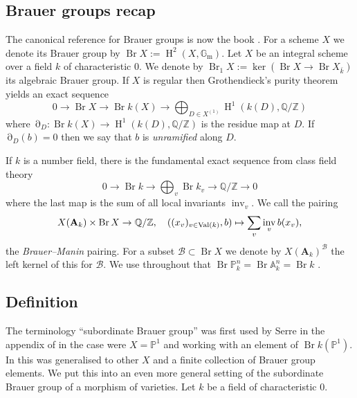 \documentclass[a4paper,12pt,reqno]{amsart}
\numberwithin{equation}{section} \numberwithin{figure}{section}
\DeclareMathOperator{\Br}{Br} \DeclareMathOperator{\Brnr}{Br_{nr}}
\DeclareMathOperator{\inv}{inv} \DeclareMathOperator{\res}{\partial}
\DeclareMathOperator{\HH}{H}
\renewcommand\P{\mathbb{P}}
\newcommand\Z{\mathbb{Z}}
\newcommand\Q{\mathbb{Q}}
\newcommand\G{\mathbb{G}}
\newcommand\Gm{\G_\mathrm{m}}
\newcommand{\Adele}{\mathbf{A}}
\newcommand{\br}{\mathscr{B}}
\newcommand{\A}{\mathbb{A}}
\renewcommand{\#}{\sharp}
\theoremstyle{definition}
\numberwithin{lemma}{section}
\begin{document}
\subsection{Brauer groups recap}

The canonical reference for Brauer groups is now the book \cite{Brauer}. For a scheme $X$ we denote its Brauer group by $\Br X :=\HH^2(X,\Gm)$. Let $X$ be an integral scheme over a field $k$ of characteristic $0$. We denote by $\Br_1 X := \ker( \Br X \to \Br X_{\bar{k}})$ its algebraic Brauer group. If $X$ is regular then Grothendieck's purity theorem \cite[Thm.~3.7.2]{Brauer} yields an exact sequence
\begin{equation} \label{seq:purity}
	0 \to \Br X \to \Br k(X) \to \bigoplus_{D \in X^{(1)}} \HH^1(k(D), \Q/\Z)
\end{equation}
where $\res_D: \Br k(X) \to \HH^1(k(D), \Q/\Z)$ is the residue map at $D$. If $\res_D(b) = 0$ then we say that $b$ is \emph{unramified} along $D$. 

If $k$ is a number field, there is the fundamental exact sequence from class field theory
\begin{equation} \label{seq:CFT}
	0 \to \Br k \to \bigoplus_v \Br k_v \to \Q/\Z \to 0
\end{equation}
where the last map is the sum of all local invariants $\inv_v$. We call the pairing
\begin{equation} \label{def:BM_pairing}
X(\Adele_k) \times \Br X \to \Q/\Z, \quad ( (x_v)_{v \in \Val(k)}, b) \mapsto 
\sum_v \inv_v b(x_v),
\end{equation}
the \emph{Brauer--Manin} pairing. For a subset $\br \subset \Br X$ we denote by $X(\Adele_k)^{\br}$ the left kernel of this for $\br$. We use throughout that $\Br \P^n_k = \Br \A^n_k = \Br k$ \cite[\S 5.1]{Brauer}.



\subsection{Definition}
The terminology ``subordinate Brauer group'' was first used by Serre in the appendix of \cite[Ch.~II]{Ser97} in the case were $X = \P^1$ and working with an element of $\Br k(\P^1)$. In \cite[\S 2.6]{Lou18} this was generalised to other $X$ and a finite collection of Brauer group elements. We put this into an even more general setting of the subordinate Brauer group of a morphism of varieties. Let $k$ be a field of characteristic $0$.
\end{document}
